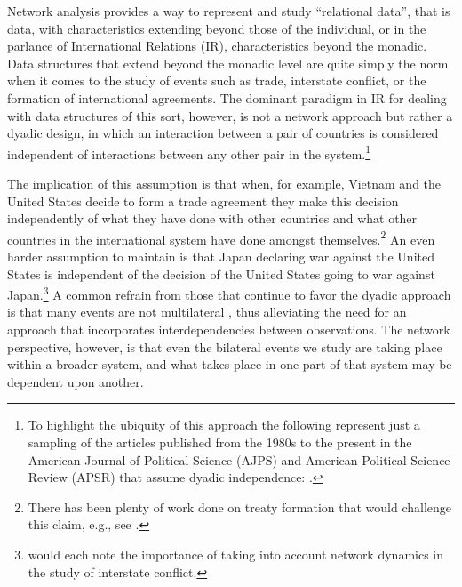 Network analysis provides a way to represent and study ``relational data'', that is data, with characteristics extending beyond those of the individual, or in the parlance of International Relations (IR), characteristics beyond the monadic. Data structures that extend beyond the monadic level are quite simply the norm when it comes to the study of events such as trade, interstate conflict, or the formation of international agreements. The dominant paradigm in IR for dealing with data structures of this sort, however, is not a network approach but rather a dyadic design, in which an interaction between a pair of countries is considered independent of interactions between any other pair in the system.\footnote{To highlight the ubiquity of this approach the following represent just a sampling of the articles published from the 1980s to the present in the American Journal of Political Science (AJPS) and American Political Science Review (APSR) that assume dyadic independence: \citet{dixon:1983,mansfield:etal:2000,lemke:reed:2001a,mitchell:2002,dafoe:2011a,fuhrmann:sechser:2014,carnegie:2014}.} 

The implication of this assumption is that when, for example, Vietnam and the United States decide to form a trade agreement they make this decision independently of what they have done with other countries and what other countries in the international system have done amongst themselves.\footnote{There has been plenty of work done on treaty formation that would challenge this claim, e.g., see \citet{manger:etal:2012,kinne:2013}.} An even harder assumption to maintain is that Japan declaring war against the United States is independent of the decision of the United States going to war against Japan.\footnote{\citet{maoz:etal:2006,ward:etal:2007,minhas:etal:2016} would each note the importance of taking into account network dynamics in the study of interstate conflict.} A common refrain from those that continue to favor the dyadic approach is that many events are not multilateral \citep{diehl:wright:2016}, thus alleviating the need for an approach that incorporates interdependencies between observations. The network perspective, however, is that even the bilateral events we study are taking place within a broader system, and what takes place in one part of that system may be dependent upon another. 


